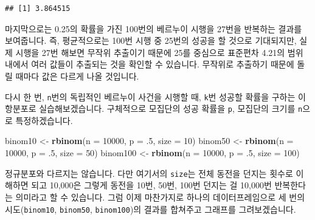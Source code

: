\documentclass[]{book}
\newenvironment{Shaded}{\begin{snugshade}}{\end{snugshade}}
\newcommand{\DataTypeTok}[1]{\textcolor[rgb]{0.13,0.29,0.53}{#1}}
\newcommand{\DecValTok}[1]{\textcolor[rgb]{0.00,0.00,0.81}{#1}}
\newcommand{\FloatTok}[1]{\textcolor[rgb]{0.00,0.00,0.81}{#1}}
\newcommand{\KeywordTok}[1]{\textcolor[rgb]{0.13,0.29,0.53}{\textbf{#1}}}
\newcommand{\NormalTok}[1]{#1}
\newcommand{\StringTok}[1]{\textcolor[rgb]{0.31,0.60,0.02}{#1}}
\begin{document}
\begin{verbatim}
## [1] 3.864515
\end{verbatim}

마지막으로는 0.25의 확률을 가진 100번의 베르누이 시행을 27번을 반복하는 결과를 보여줍니다. 즉, 평균적으로는 100번 시행 중 25번의 성공을 할 것으로 기대되지만, 실제 시행을 27번 해보면 무작위 추출이기 때문에 25를 중심으로 표준편차 4.21의 범위 내에서 여러 값들이 추출되는 것을 확인할 수 있습니다. 무작위로 추출하기 때문에 돌릴 때마다 값은 다르게 나올 것입니다.

다시 한 번, \texttt{n}번의 독립적인 베르누이 사건을 시행할 때, \texttt{k}번 성공할 확률을 구하는 이항분포로 실습해보겠습니다. 구체적으로 모집단의 성공 확률을 \texttt{p}, 모집단의 크기를 \texttt{n}으로 특정하겠습니다.

\begin{Shaded}
\begin{Highlighting}[]
\NormalTok{binom10 <-}\StringTok{ }\KeywordTok{rbinom}\NormalTok{(}\DataTypeTok{n =} \DecValTok{10000}\NormalTok{, }\DataTypeTok{p =} \FloatTok{.5}\NormalTok{, }\DataTypeTok{size =} \DecValTok{10}\NormalTok{)}
\NormalTok{binom50 <-}\StringTok{ }\KeywordTok{rbinom}\NormalTok{(}\DataTypeTok{n =} \DecValTok{10000}\NormalTok{, }\DataTypeTok{p =} \FloatTok{.5}\NormalTok{, }\DataTypeTok{size =} \DecValTok{50}\NormalTok{)}
\NormalTok{binom100 <-}\StringTok{ }\KeywordTok{rbinom}\NormalTok{(}\DataTypeTok{n =} \DecValTok{10000}\NormalTok{, }\DataTypeTok{p =} \FloatTok{.5}\NormalTok{, }\DataTypeTok{size =} \DecValTok{100}\NormalTok{)}
\end{Highlighting}
\end{Shaded}

정규분포와 다르지는 않습니다. 다만 여기서의 \texttt{size}는 전체 동전을 던지는 횟수로 이해하면 되고 10,000은 그렇게 동전을 10번, 50번, 100번 던지는 걸 10,000번 반복한다는 의미라고 할 수 있습니다. 그럼 이제 마찬가지로 하나의 데이터프레임으로 세 번의 시도(\texttt{binom10}, \texttt{binom50}, \texttt{binom100})의 결과를 합쳐주고 그래프를 그려보겠습니다.
\end{document}
